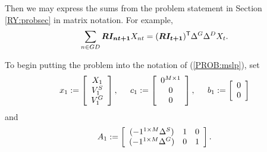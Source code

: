 Then we may express the sums from the problem statement in Section \ref{RY:probsec} in matrix notation.  For example,
\begin{equation*}
\sum_{n\in GD} \mathbf{\boldsymbol{RI_{nt+1}}} X_{nt} = (\mathbf{\boldsymbol{RI_{t+1}}})^{\mbox{\scriptsize\sf T}} \Delta^G \Delta^D X_t.
\end{equation*}

To begin putting the problem into the notation of (\ref{PROB:mslp}), set
\begin{equation*}
x_1:= \left[
\begin{array}{c}
	X_1\\
	V_1^S\\
	V_1^G
\end{array}
\right],
\hspace{0.2in}
c_1 := \left[
\begin{array}{c}
	0^{M\times 1}\\
	0\\
	0
\end{array}
\right],
\hspace{0.2in}
b_1:=\left[
\begin{array}{c}
	0\\
	0
\end{array}
\right]
\end{equation*}
and
\begin{equation*}
A_1:=\left[
\begin{array}{ccc}
	(-1^{1\times M} \Delta^S)		& 1	& 0\\
	(-1^{1\times M} \Delta^G)		& 0	& 1
\end{array}
\right].
\end{equation*}


